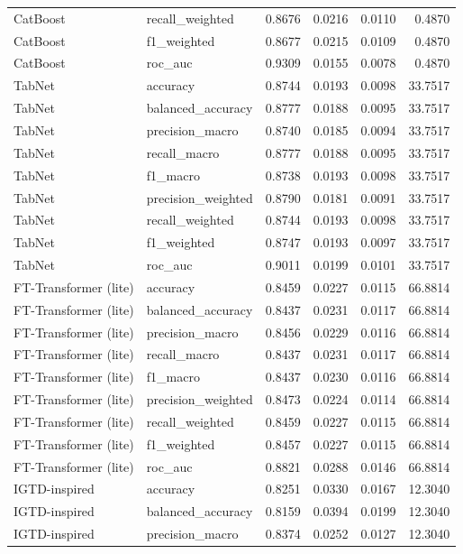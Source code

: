 \begin{tabular}{llrrrr}
CatBoost & recall_weighted & 0.8676 & 0.0216 & 0.0110 & 0.4870 \\
CatBoost & f1_weighted & 0.8677 & 0.0215 & 0.0109 & 0.4870 \\
CatBoost & roc_auc & 0.9309 & 0.0155 & 0.0078 & 0.4870 \\
TabNet & accuracy & 0.8744 & 0.0193 & 0.0098 & 33.7517 \\
TabNet & balanced_accuracy & 0.8777 & 0.0188 & 0.0095 & 33.7517 \\
TabNet & precision_macro & 0.8740 & 0.0185 & 0.0094 & 33.7517 \\
TabNet & recall_macro & 0.8777 & 0.0188 & 0.0095 & 33.7517 \\
TabNet & f1_macro & 0.8738 & 0.0193 & 0.0098 & 33.7517 \\
TabNet & precision_weighted & 0.8790 & 0.0181 & 0.0091 & 33.7517 \\
TabNet & recall_weighted & 0.8744 & 0.0193 & 0.0098 & 33.7517 \\
TabNet & f1_weighted & 0.8747 & 0.0193 & 0.0097 & 33.7517 \\
TabNet & roc_auc & 0.9011 & 0.0199 & 0.0101 & 33.7517 \\
FT-Transformer (lite) & accuracy & 0.8459 & 0.0227 & 0.0115 & 66.8814 \\
FT-Transformer (lite) & balanced_accuracy & 0.8437 & 0.0231 & 0.0117 & 66.8814 \\
FT-Transformer (lite) & precision_macro & 0.8456 & 0.0229 & 0.0116 & 66.8814 \\
FT-Transformer (lite) & recall_macro & 0.8437 & 0.0231 & 0.0117 & 66.8814 \\
FT-Transformer (lite) & f1_macro & 0.8437 & 0.0230 & 0.0116 & 66.8814 \\
FT-Transformer (lite) & precision_weighted & 0.8473 & 0.0224 & 0.0114 & 66.8814 \\
FT-Transformer (lite) & recall_weighted & 0.8459 & 0.0227 & 0.0115 & 66.8814 \\
FT-Transformer (lite) & f1_weighted & 0.8457 & 0.0227 & 0.0115 & 66.8814 \\
FT-Transformer (lite) & roc_auc & 0.8821 & 0.0288 & 0.0146 & 66.8814 \\
IGTD-inspired & accuracy & 0.8251 & 0.0330 & 0.0167 & 12.3040 \\
IGTD-inspired & balanced_accuracy & 0.8159 & 0.0394 & 0.0199 & 12.3040 \\
IGTD-inspired & precision_macro & 0.8374 & 0.0252 & 0.0127 & 12.3040 \\

\end{tabular}

